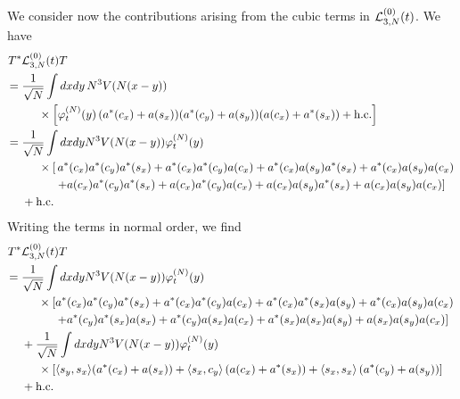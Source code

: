 \documentclass[11pt,a4paper]{article}
\newcommand{\cL}{{\cal L}}
\begin{document}
We consider now the contributions arising from the cubic terms in $\cL^{(0)}_{3,N} (t)$.
We have
\[ \begin{split}
T^* & \cL_{3,N}^{(0)} (t) T \\ = \; & \frac{1}{\sqrt{N}} \int dx dy \, N^3 V(N (x-y)) \\ &\hspace{.5cm} \times \left[ \varphi_t^{(N)} (y) \, ( a^* (c_x) + a (s_x)) (a^* (c_y) + a (s_y)) (a (c_x) + a^* (s_x))  + \text{h.c.} \right] \\ = \; & \frac{1}{\sqrt{N}} \int dx dy N^3 V(N(x-y)) \varphi_t^{(N)} (y) \\ & \hspace{.5cm} 
\times \left[ \, a^* (c_x) a^* (c_y) a^* (s_x) + a^* (c_x) a^* (c_y) a(c_x) + a^* (c_x) a (s_y) a^* (s_x) +a^* (c_x) a (s_y) a (c_x)  \right. \\ & \hspace{1cm} \left. +  a (c_x) a^* (c_y) a^* (s_x) + a (c_x) a^* (c_y) a(c_x) + a (c_x) a (s_y) a^* (s_x) +a (c_x) a (s_y) a (c_x) \right]  \\ &+\text{h.c.} 
\end{split} \]
Writing the terms in normal order, we find
\begin{equation}\label{eq:cub-no} \begin{split} 
T^* &\cL_{3,N}^{(0)} (t) T  \\ = \; &\frac{1}{\sqrt{N}}  \int dx dy N^3 V(N(x-y)) \varphi_t^{(N)} (y) \\ & \hspace{.5cm}  \times \left[ a^* (c_x) a^* (c_y) a^* (s_x) + a^* (c_x) a^* (c_y) a(c_x) + a^* (c_x)  a^* (s_x) a (s_y) +a^* (c_x) a (s_y) a (c_x)  \right. \\ & \hspace{1cm} \left. +   a^* (c_y) a^* (s_x) a (s_x) + a^* (c_y) a (s_x)  a(c_x) + a^* (s_x) a (s_x) a (s_y)  +a (s_x) a (s_y) a (c_x) \right]  \\
&+ \frac{1}{\sqrt{N}} \int dx dy N^3 V (N (x-y)) \varphi_t^{(N)} (y) \\ &\hspace{.5cm} \times  \left[  \langle s_y , s_x \rangle (a^* (c_x) + a (s_x)) + \langle s_x, c_y \rangle \left( a (c_x) + a^* (s_x) \right) + \langle s_x, s_x \rangle \left(a^* (c_y) + a (s_y)\right) \right] 
\\ &+\text{h.c.}
\end{split} \end{equation}
\end{document}
